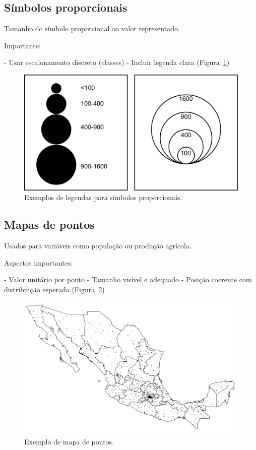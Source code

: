 \subsection{Símbolos proporcionais}

Tamanho do símbolo proporcional ao valor representado.

Importante:

- Usar escalonamento discreto (classes)
- Incluir legenda clara (Figura~\ref{Fig:EjemplosLeyendaSimbolosProporcionales})

\begin{figure}[!hbt]
\centering
\includegraphics[width=.65\columnwidth]{Visualizacao/EjemplosLeyendaSimbolosProporcionales.pdf}
\caption{\small Exemplos de legendas para símbolos proporcionais.}
\label{Fig:EjemplosLeyendaSimbolosProporcionales} 
\end{figure}

\subsection{Mapas de pontos}

Usados para variáveis como população ou produção agrícola.

Aspectos importantes:

- Valor unitário por ponto
- Tamanho visível e adequado
- Posição coerente com distribuição esperada (Figura~\ref{Fig:MapaPontos})

\begin{figure}[!hbt]
\centering
\includegraphics[width=.8\columnwidth]{Visualizacao/MapaPuntos.png}
\caption{\small Exemplo de mapa de pontos.}
\label{Fig:MapaPontos} 
\end{figure}

